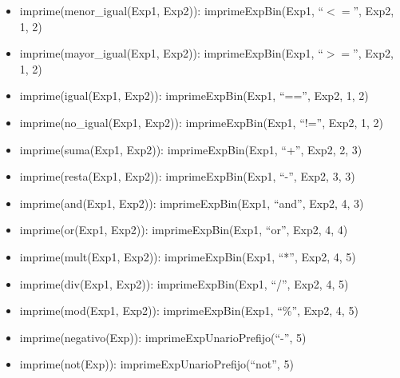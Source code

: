 \documentclass[11pt]{article}
\begin{document}
\begin{itemize}
            \item imprime(menor\_igual(Exp1, Exp2)):
                \subitem imprimeExpBin(Exp1, “$<=$”, Exp2, 1, 2)
            
            \item imprime(mayor\_igual(Exp1, Exp2)):
                \subitem imprimeExpBin(Exp1, “$>=$”, Exp2, 1, 2)
            
            \item imprime(igual(Exp1, Exp2)):
                \subitem imprimeExpBin(Exp1, “==”, Exp2, 1, 2)
            
            \item imprime(no\_igual(Exp1, Exp2)):
                \subitem imprimeExpBin(Exp1, “!=”, Exp2, 1, 2)
            
            \item imprime(suma(Exp1, Exp2)):
                \subitem imprimeExpBin(Exp1, “+”, Exp2, 2, 3)
            
            \item imprime(resta(Exp1, Exp2)):
                \subitem imprimeExpBin(Exp1, “-”, Exp2, 3, 3)
            
            \item imprime(and(Exp1, Exp2)):
                \subitem imprimeExpBin(Exp1, “and”, Exp2, 4, 3)
            
            \item imprime(or(Exp1, Exp2)):
                \subitem imprimeExpBin(Exp1, “or”, Exp2, 4, 4)
            
            \item imprime(mult(Exp1, Exp2)):
                \subitem imprimeExpBin(Exp1, “*”, Exp2, 4, 5)
            
            \item imprime(div(Exp1, Exp2)):
                \subitem imprimeExpBin(Exp1, “/”, Exp2, 4, 5)
            
            \item imprime(mod(Exp1, Exp2)):
                \subitem imprimeExpBin(Exp1, “\%”, Exp2, 4, 5)
            
            \item imprime(negativo(Exp)):
                \subitem imprimeExpUnarioPrefijo(“-”, 5)
            
            \item imprime(not(Exp)):
                \subitem imprimeExpUnarioPrefijo(“not”, 5)
            

\end{itemize}
\end{document}
